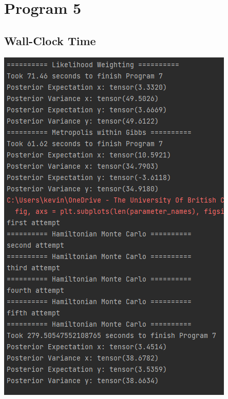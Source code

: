 \documentclass[10pt]{homeworg}
\begin{document}

\section{Program 5}
\subsection{Wall-Clock Time}
\begin{center}
\includegraphics{figures/program_5_time.png}
\end{center}
\end{document}
